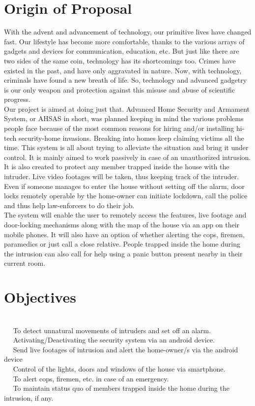 \documentclass[margin, centered]{res}
\begin{document}
\begin{resume}
\section{Origin of Proposal}
With the advent and advancement of technology, our primitive lives have changed fast. Our lifestyle has become more comfortable, thanks to the various arrays of gadgets and devices for communication, education, etc. But just like there are two sides of the same coin, technology has its shortcomings too. Crimes have existed in the past, and have only aggravated in nature. Now, with technology, criminals have found a new breath of life. So, technology and advanced gadgetry is our only weapon and protection against this misuse and abuse of scientific progress.\\
Our project is aimed at doing just that. Advanced Home Security and Armament System, or AHSAS in short, was planned keeping in mind the various problems people face because of the most common reasons for hiring and/or installing hi-tech security-home invasions. Breaking into homes keep claiming victims all the time. This system is all about trying to alleviate the situation and bring it under control. It is mainly aimed to work passively in case of an unauthorized intrusion. It is also created to protect any member trapped inside the house with the intruder. Live video footages will be taken, thus keeping track of the intruder. Even if someone manages to enter the house without setting off the alarm, door locks remotely operable by the home-owner can initiate lockdown, call the police and thus help law-enforcers to do their job.\\
The system will enable the user to remotely access the features, live footage and door-locking mechanisms along with the map of the house via an app on their mobile phones. It will also have an option of whether alerting the cops, firemen, paramedics or just call a close relative. People trapped inside the home during the intrusion can also call for help using a panic button present nearby in their current room.
\section{Objectives}
\hspace{5mm} \\
~\textbullet~ To detect unnatural movements of intruders and set off an alarm.\\
~\textbullet~ Activating/Deactivating the security system via an android device.\\
~\textbullet~ Send live footages of intrusion and alert the home-owner/s via the android device\\
~\textbullet~ Control of the lights, doors and windows of the house via smartphone.\\
~\textbullet~ To alert cops, firemen, etc. in case of an emergency.\\
~\textbullet~ To maintain status quo of members trapped inside the home during the intrusion, if any.


\end{resume}
\end{document}
